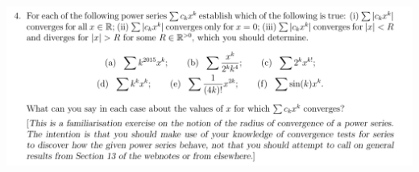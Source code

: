\documentclass[12pt]{article}
\begin{document}
\newpage
\subsection{}
\begin{mdframed}
\includegraphics[width=400pt]{img/analysis--oxford-M2-I-6-4.png}
\end{mdframed}
\end{document}
